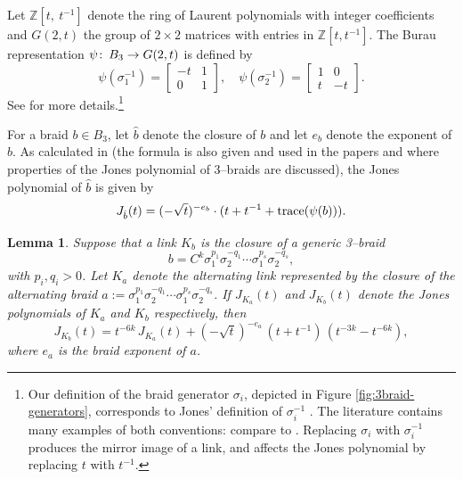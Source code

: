 \documentclass[11pt]{amsart}
\newcommand{\ZZ}{{\mathbb{Z}}}
\def\co{\colon\thinspace}
\theoremstyle{plain}
\newtheorem{lemma}[theorem]{Lemma}
\theoremstyle{definition}
\begin{document}
Let $\ZZ [t, \ t^{-1}]$ denote the ring of Laurent polynomials with
integer coefficients and $G(2, t)$ the group of $2\times 2$ matrices
with entries in $\ZZ [t, t^{-1}]$.  The Burau representation $\psi\co
B_3 \to G(2,t)$ is defined by
\begin{equation}
  \psi(\sigma_1^{-1}) = \left[\begin{array}{cc}
			-t&1\\0&1\end{array}\right], \quad 
\psi(\sigma_2^{-1}) = \left[\begin{array}{cc}
		1&0\\t&-t\end{array}\right]. 
\label{eqn:burau} %
\end{equation}
See \cite{birman:book, jones} for more details.\protect\footnote{Our 
definition of the braid generator $\sigma_i$, depicted 
in Figure \ref{fig:3braid-generators}, corresponds to Jones' definition of 
$\sigma_i^{-1}$ \cite{jones}. The literature contains many examples of both conventions: 
compare \cite{birman:3braid-jones, burde-zieschang:knots} to \cite{kanenobu, 
murasugi}. Replacing $\sigma_i$ with $\sigma_i^{-1}$ produces the mirror 
image of a link, and affects the Jones polynomial by replacing $t$ with $t^{-1}$.}

For a braid $b\in B_3$, let $\hat {b}$ denote the closure of $b$ and
let $e_b$ denote the exponent of $b$. As calculated in \cite{jones}
(the formula is also given and used in the papers
\cite{birman:3braid-jones} and \cite{kanenobu} where properties of the
Jones polynomial of 3--braids are discussed), the Jones polynomial of
${\hat b}$ is given by
\begin{equation}
  J_{{\hat b}}(t)= (-\sqrt t)^{-e_b}\cdot (t+t^{-1}+ {\rm trace}(\psi
  (b))).
\label{eqn:jones-burau} %
\end{equation}


\begin{lemma}
Suppose that a link $K_b$ is the closure of a generic 3--braid
$$b= C^k \sigma_1^{p_1} \sigma_2^{-q_1} \cdots \sigma_1^{p_s}
\sigma_2^{-q_s},$$
%
with $p_i, q_i>0$.  Let $K_a$ denote the alternating link represented
by the closure of the alternating braid $a:=\sigma_1^{p_1}
\sigma_2^{-q_1} \cdots \sigma_1^{p_s} \sigma_2^{-q_s}$.  If
$J_{K_a}(t)$ and $J_{K_b}(t)$ denote the Jones polynomials of $K_a$
and $K_b$ respectively, then
$$ J_{{K_b}}(t)= t^{-6k}\, J_{{K_a}}(t)+ (-\sqrt t)^{-e_a}\,
\left(t+t^{-1}\right) \, \left(t^{-3k}-t^{-6k}\right),$$
\noindent where $e_a$ is the braid exponent of $a$.
\label{lemma:generic}
\end{lemma}
\end{document}
